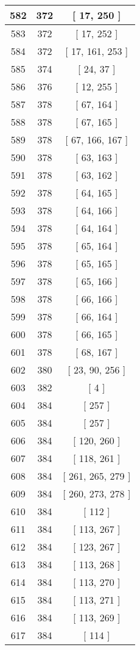 \begin{center}
\begin{longtable}[H]{|| c c c ||}
582 & 372 & [ 17, 250 ]
\\\hline
583 & 372 & [ 17, 252 ]
\\\hline
584 & 372 & [ 17, 161, 253 ]
\\\hline
585 & 374 & [ 24, 37 ]
\\\hline
586 & 376 & [ 12, 255 ]
\\\hline
587 & 378 & [ 67, 164 ]
\\\hline
588 & 378 & [ 67, 165 ]
\\\hline
589 & 378 & [ 67, 166, 167 ]
\\\hline
590 & 378 & [ 63, 163 ]
\\\hline
591 & 378 & [ 63, 162 ]
\\\hline
592 & 378 & [ 64, 165 ]
\\\hline
593 & 378 & [ 64, 166 ]
\\\hline
594 & 378 & [ 64, 164 ]
\\\hline
595 & 378 & [ 65, 164 ]
\\\hline
596 & 378 & [ 65, 165 ]
\\\hline
597 & 378 & [ 65, 166 ]
\\\hline
598 & 378 & [ 66, 166 ]
\\\hline
599 & 378 & [ 66, 164 ]
\\\hline
600 & 378 & [ 66, 165 ]
\\\hline
601 & 378 & [ 68, 167 ]
\\\hline
602 & 380 & [ 23, 90, 256 ]
\\\hline
603 & 382 & [ 4 ]
\\\hline
604 & 384 & [ 257 ]
\\\hline
605 & 384 & [ 257 ]
\\\hline
606 & 384 & [ 120, 260 ]
\\\hline
607 & 384 & [ 118, 261 ]
\\\hline
608 & 384 & [ 261, 265, 279 ]
\\\hline
609 & 384 & [ 260, 273, 278 ]
\\\hline
610 & 384 & [ 112 ]
\\\hline
611 & 384 & [ 113, 267 ]
\\\hline
612 & 384 & [ 123, 267 ]
\\\hline
613 & 384 & [ 113, 268 ]
\\\hline
614 & 384 & [ 113, 270 ]
\\\hline
615 & 384 & [ 113, 271 ]
\\\hline
616 & 384 & [ 113, 269 ]
\\\hline
617 & 384 & [ 114 ]
\\\hline

\end{longtable}
\end{center}
